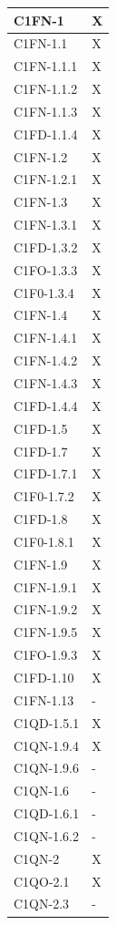 \begin{footnotesize}
\begin{longtable}{|p{}|p{}|}
 C1FN-1 &X \\ \hline
 C1FN-1.1 &X  \\ \hline
 C1FN-1.1.1 &X  \\ \hline
 C1FN-1.1.2  &X  \\ \hline
 C1FN-1.1.3 &X  \\ \hline
 C1FD-1.1.4  &X  \\ \hline
 C1FN-1.2 &X  \\ \hline
 C1FN-1.2.1 &X  \\ \hline
 C1FN-1.3 &X  \\ \hline
 C1FN-1.3.1  &X  \\ \hline
 C1FD-1.3.2 &X  \\ \hline
 C1FO-1.3.3 &X  \\ \hline
 C1F0-1.3.4 &X  \\ \hline
 C1FN-1.4 &X  \\ \hline
 C1FN-1.4.1 &X  \\ \hline
 C1FN-1.4.2 &X  \\ \hline
 C1FN-1.4.3 &X  \\ \hline
 C1FD-1.4.4 &X  \\ \hline
 C1FD-1.5 &X  \\ \hline
 C1FD-1.7 &X  \\ \hline
 C1FD-1.7.1  &X  \\ \hline
 C1F0-1.7.2 &X  \\ \hline
 C1FD-1.8 &X  \\ \hline
 C1F0-1.8.1 &X  \\ \hline
 C1FN-1.9 &X  \\ \hline
 C1FN-1.9.1  &X  \\ \hline
 C1FN-1.9.2 &X  \\ \hline
 C1FN-1.9.5 &X  \\ \hline
 C1FO-1.9.3 &X  \\ \hline
 C1FD-1.10 &X  \\ \hline
 C1FN-1.13 &-  \\ \hline
 C1QD-1.5.1 &X  \\ \hline
 C1QN-1.9.4 &X  \\ \hline
 C1QN-1.9.6 &-  \\ \hline
 C1QN-1.6 &- \\ \hline
 C1QD-1.6.1&- \\ \hline
 C1QN-1.6.2&-   \\ \hline
 C1QN-2&X \\ \hline
 C1QO-2.1&X \\ \hline
 C1QN-2.3&-  \\ \hline

\end{longtable}
\end{footnotesize}
